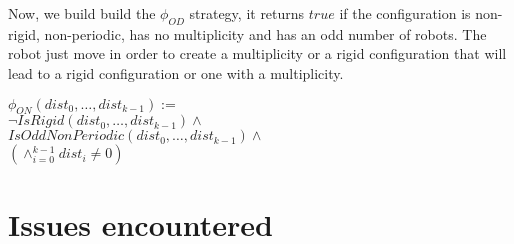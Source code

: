 \documentclass{article}
\begin{document}
Now, we build build the $\phi_{OD}$ strategy, it returns $true$ if the configuration is non-rigid, non-periodic, has no multiplicity and has an odd number of robots. The robot just move in order to create a multiplicity or a rigid configuration that will lead to a rigid configuration or one with a multiplicity.

\begin{center}
    
$\phi_{ON}(dist_{0}, \ldots , dist_{k-1}):=$\\
$\lnot IsRigid(dist_{0}, \ldots ,dist_{k-1}) \land $\\
$IsOddNonPeriodic(dist_{0}, \ldots , dist_{k-1}) \land $\\
$(\land_{i=0}^{k-1} dist_{i} \not= 0)$
\end{center}

\section{Issues encountered}
\end{document}

